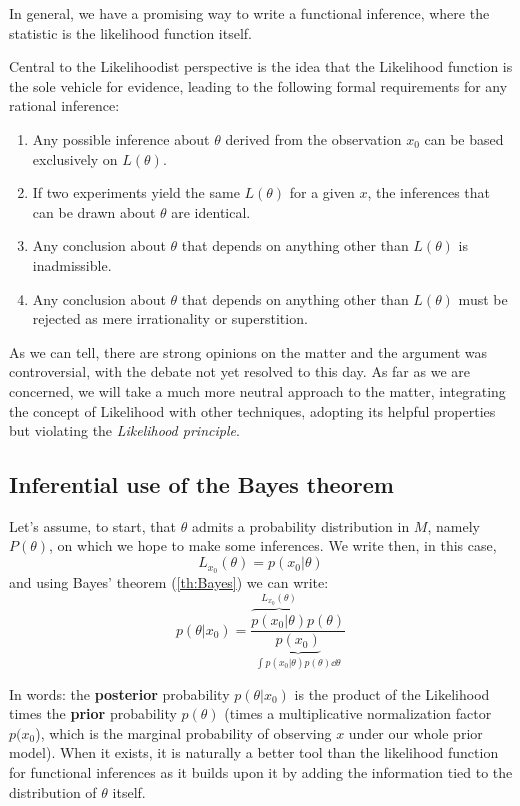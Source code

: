 In general, we have a promising way to write a functional inference, where the statistic is the likelihood function itself. 

\begin{definition}
	Central to the Likelihoodist perspective is the idea that the Likelihood function is the sole vehicle for evidence, leading to the following formal requirements for any rational inference: 
	\begin{enumerate}
		\item Any possible inference about $\theta$ derived from the observation $x_0$ can be based exclusively on $L(\theta)$.
		\item If two experiments yield the same $L(\theta)$ for a given $x$, the inferences that can be drawn about $\theta$ are identical.
		\item Any conclusion about $\theta$ that depends on anything other than $L(\theta)$ is inadmissible.
		\item Any conclusion about $\theta$ that depends on anything other than $L(\theta)$ must be rejected as mere irrationality or superstition.
	\end{enumerate}
\end{definition}

As we can tell, there are strong opinions on the matter and the argument was controversial, with the debate not yet resolved to this day. As far as we are concerned, we will take a much more neutral approach to the matter, integrating the concept of Likelihood with other techniques, adopting its helpful properties but violating the \emph{Likelihood principle}.

\subsection{Inferential use of the Bayes theorem}
\label{subsec:Inf_Bayes}

Let's assume, to start, that $\theta$ admits a probability distribution in $M$, namely $P(\theta)$, on which we hope to make some inferences. We write then, in this case,
	\[
	L_{x_0}(\theta)=p(x_0|\theta)
	\]
and using Bayes' theorem (\ref{th:Bayes}) we can write:
	\begin{equation}
	p(\theta|x_0) = \frac{\overbrace{p(x_0|\theta)}^{L_{x_0}(\theta)}p(\theta)}{\underbrace{p(x_0)}_{\int p(x_0|\theta)p(\theta)\dd\theta}}
	\label{def:posterior}
	\end{equation}
 
 In words: the \textbf{posterior} probability $p(\theta|x_0)$ is the product of the Likelihood times the \textbf{prior} probability $p(\theta)$ (times a multiplicative normalization factor $p(x_0$), which is the marginal probability of observing $x$ under our whole prior model). When it exists, it is naturally a better tool than the likelihood function for functional inferences as it builds upon it by adding the information tied to the distribution of $\theta$ itself. 
 
